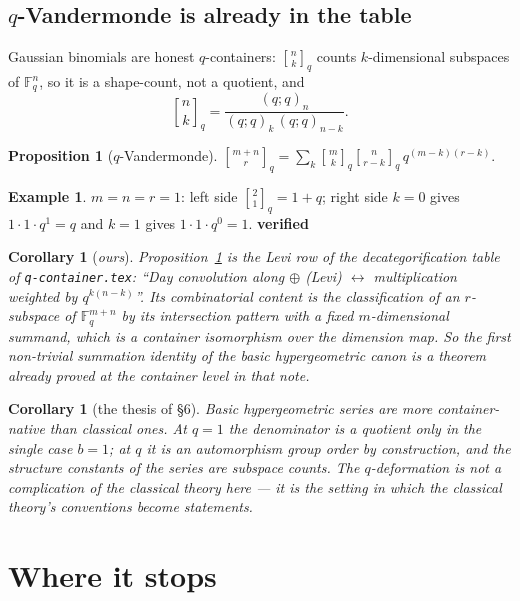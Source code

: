 \documentclass[11pt,a4paper]{article}
\newtheorem{proposition}[theorem]{Proposition}
\newtheorem{corollary}[theorem]{Corollary}
\theoremstyle{definition}
\newtheorem{example}[theorem]{Example}
\theoremstyle{remark}
\newcommand{\FF}{\mathbb{F}}
\newcommand{\qbin}[2]{\genfrac{[}{]}{0pt}{}{#1}{#2}_{q}}
\newcommand{\OK}{\textcolor{okgreen}{\textbf{verified}}}
\begin{document}
\subsection{$q$-Vandermonde is already in the table}

Gaussian binomials are honest $q$-containers: $\qbin{n}{k}$ counts $k$-dimensional
subspaces of $\FF_q^n$, so it is a shape-count, not a quotient, and
\[
  \qbin{n}{k} = \frac{(q;q)_n}{(q;q)_k\,(q;q)_{n-k}} .
\]

\begin{proposition}[$q$-Vandermonde]\label{prop:qvan}
$\displaystyle \qbin{m+n}{r} = \sum_{k}\qbin{m}{k}\qbin{n}{r-k}\,q^{(m-k)(r-k)} .$
\end{proposition}

\begin{example}\label{ex:qvan}
$m = n = r = 1$: left side $\qbin{2}{1} = 1+q$; right side
$k=0$ gives $1\cdot1\cdot q^{1} = q$ and $k=1$ gives $1\cdot1\cdot q^{0} = 1$. \OK
\end{example}

\begin{corollary}[\emph{ours}]\label{cor:levi}
Proposition~\ref{prop:qvan} is the Levi row of the decategorification table of
\texttt{q-container.tex}: ``Day convolution along $\oplus$ (Levi) $\leftrightarrow$
multiplication weighted by $q^{k(n-k)}$''. Its combinatorial content is the
classification of an $r$-subspace of $\FF_q^{m+n}$ by its intersection pattern with a
fixed $m$-dimensional summand, which is a container isomorphism over the dimension
map. So the first non-trivial summation identity of the basic hypergeometric canon is
a theorem already proved at the container level in that note.
\end{corollary}

\begin{corollary}[the thesis of \S6]\label{cor:thesis}
Basic hypergeometric series are more container-native than classical ones. At $q = 1$
the denominator is a quotient only in the single case $b = 1$; at $q$ it is an
automorphism group order by construction, and the structure constants of the series
are subspace counts. The $q$-deformation is not a complication of the classical
theory here --- it is the setting in which the classical theory's conventions become
statements.
\end{corollary}

\section{Where it stops}
\end{document}
